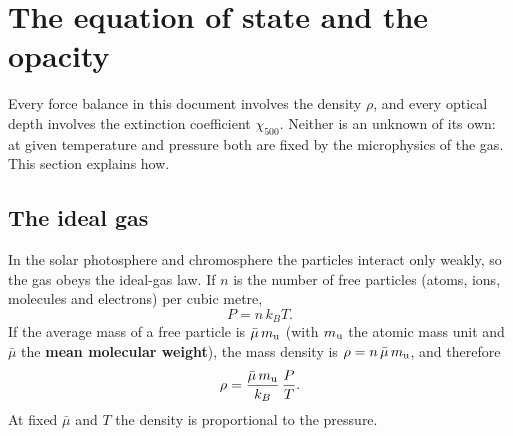 \section{The equation of state and the opacity}\label{sec:eos}
Every force balance in this document involves the density $\rho$, and every optical depth involves the extinction
coefficient $\chi_{500}$. Neither is an unknown of its own: at given temperature and pressure both are fixed by the
microphysics of the gas. This section explains how.

\subsection{The ideal gas}
In the solar photosphere and chromosphere the particles interact only weakly, so the gas obeys the ideal-gas law. If $n$
is the number of free particles (atoms, ions, molecules and electrons) per cubic metre,
\begin{equation}
P=n\,k_BT .\label{eq:ideal}
\end{equation}
If the average mass of a free particle is $\bar\mu\,m_{\rm u}$ (with $m_{\rm u}$ the atomic mass unit and $\bar\mu$ the
\textbf{mean molecular weight}), the mass density is $\rho=n\,\bar\mu\,m_{\rm u}$, and therefore
\begin{equation}
\rho=\frac{\bar\mu\,m_{\rm u}}{k_B}\,\frac{P}{T}.\label{eq:rho_ideal}
\end{equation}
At fixed $\bar\mu$ and $T$ the density is proportional to the pressure.

